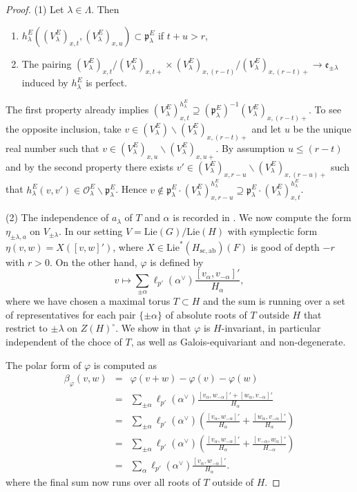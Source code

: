 \documentclass{article}
\def\mf#1{\mathfrak{#1}}
\def\sm{\smallsetminus}
\def\cO{\mathcal{O}}
\theoremstyle{definition}
\numberwithin{equation}{subsection}
\renewcommand{\-}{\hyp{}}
\begin{document}
\begin{proof}
	(1) Let $\lambda \in \Lambda$. Then
	\begin{enumerate}
		\item $h_\lambda^E((V_\lambda^E)_{x,t},(V_\lambda^E)_{x,u}) \subset \mf{p}_\lambda^E$ if $t+u>r$,
		\item The pairing $(V_\lambda^E)_{x,t}/(V_\lambda^E)_{x,t+} \times (V_\lambda^E)_{x,(r-t)}/(V_\lambda^E)_{x,(r-t)+} \to  \mathfrak e_{\pm\lambda}$ induced by $h_\lambda^E$ is perfect.
	\end{enumerate}
	The first property already implies $(V_\lambda^E)_{x,t}^{h_\lambda^E} \supseteq (\mf{p}_\lambda^E)^{-1}(V_\lambda^E)_{x,(r-t)+}$. To see the opposite inclusion, take $v \in (V_\lambda^E) \sm (V_\lambda^E)_{x,(r-t)+}$ and let $u$ be the unique real number such that $v \in (V_\lambda^E)_{x,u} \sm (V_\lambda^E)_{x,u+}$. By assumption $u \leq (r-t)$ and by the second property there exists $v' \in (V_\lambda^E)_{x,r-u} \sm (V_\lambda^E)_{x,(r-u)+}$ such that $h_\lambda^E(v,v') \in \cO_\lambda^E \sm \mf{p}_\lambda^E$. Hence $v \notin \mf{p}_\lambda^E\cdot (V_\lambda^E)_{x,r-u}^{h_\lambda^E} \supseteq \mf{p}_\lambda^E\cdot (V_\lambda^E)_{x,t}^{h_\lambda^E}$.

	(2) The independence of $a_\lambda$ of $T$ and $\alpha$ is recorded in \cite[Lemma 5.4.9]{FKS23}. We now compute the form $\eta_{\pm\lambda,a}$ on $V_{\pm\lambda}$. In our setting $V=\mathrm{Lie}(G)/\mathrm{Lie}(H)$ with symplectic form $\eta(v,w)=X([v,w]')$, where $X \in \mathrm{Lie}^*(H_\mathrm{sc,ab})(F)$ is good of depth $-r$ with $r>0$. On the other hand, $\varphi$ is defined by
\[ v \mapsto \sum_{\pm\alpha} \ell_{p'}(\alpha^\vee)\frac{[v_\alpha,v_{-\alpha}]'}{H_\alpha}, \]
where we have chosen a maximal torus $T \subset H$ and the sum is running over a set of representatives for each pair $\{\pm\alpha\}$ of absolute roots of $T$ outside $H$ that restrict to $\pm\lambda$ on $Z(H)^\circ$. We show in \cite[Proposition 5.4.6]{FKS23} that $\varphi$ is $H$-invariant, in particular independent of the choce of $T$, as well as Galois-equivariant and non-degenerate.

The polar form of $\varphi$ is computed as 
\begin{eqnarray*}
	\beta_\varphi(v,w)&=&\varphi(v+w)-\varphi(v)-\varphi(w)\\
	&=&\sum_{\pm\alpha}\ell_{p'}(\alpha^\vee)\frac{[v_\alpha,w_{-\alpha}]'+[w_\alpha,v_{-\alpha}]'}{H_\alpha}\\
	&=&\sum_{\pm\alpha}\ell_{p'}(\alpha^\vee)\left(\frac{[v_\alpha,w_{-\alpha}]'}{H_\alpha}+\frac{[w_\alpha,v_{-\alpha}]'}{{H_\alpha}}\right)\\
	&=&\sum_{\pm\alpha}\ell_{p'}(\alpha^\vee)\left(\frac{[v_\alpha,w_{-\alpha}]'}{H_\alpha}+\frac{[v_{-\alpha},w_\alpha]'}{{H_{-\alpha}}}\right)\\
	&=&\sum_{\alpha}\ell_{p'}(\alpha^\vee)\frac{[v_\alpha,w_{-\alpha}]'}{H_\alpha}.
\end{eqnarray*}
where the final sum now runs over all roots of $T$ outside of $H$.


\end{proof}
\end{document}
